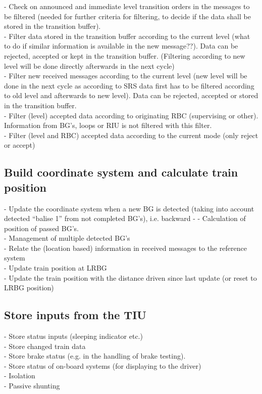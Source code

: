 \documentclass{template/openetcs_report}
\begin{document}
- Check on announced and immediate level transition orders in the messages to be filtered (needed for further criteria for filtering, to decide if the data shall be stored in the transition buffer).\\
- Filter data stored in the transition buffer according to the current level (what to do if similar information is available in the new message??). Data can be rejected, accepted or kept in the transition buffer.
(Filtering according to new level will be done directly afterwards in the next cycle)\\
- Filter new received messages according to the current level (new level will be done in the next cycle as according to \gls{SRS} data first has to be filtered according to old level and afterwards to new level). Data can be rejected, accepted or stored in the transition buffer.\\
- Filter (level) accepted data according to originating RBC (supervising or other). Information from \gls{BG}'s, loops or RIU is not filtered with this filter.\\
- Filter (level and RBC) accepted data according to the current mode (only reject or accept)\\



\subsection{Build coordinate system and calculate train position}

- Update the coordinate system when a new \gls{BG} is detected (taking into account detected “balise 1” from not completed \gls{BG}'s), i.e. backward -   - Calculation of position of passed \gls{BG}'s.\\
- Management of multiple detected \gls{BG}'s\\
- Relate the (location based) information in received messages to the reference system\\
- Update train position at LR\gls{BG}\\
- Update the train position with the distance driven since last update (or reset to LR\gls{BG} position)\\



\subsection{Store inputs from the TIU}
- Store status inputs (sleeping indicator etc.)\\
- Store changed train data\\
- Store brake status (e.g. in the handling of brake testing).\\
- Store status of on-board systems (for displaying to the driver)\\
- Isolation\\
- Passive shunting\\
\end{document}
